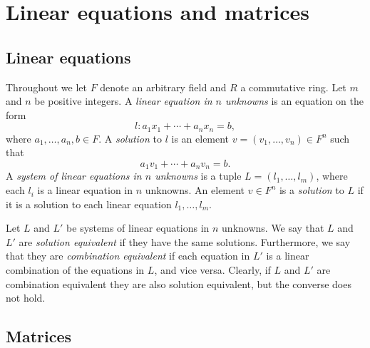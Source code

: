 \documentclass[article, a4paper, 11pt, oneside]{memoir}
\title{\doctitle}
\author{\docauthor}
\numberwithin{equation}{chapter}
\begin{document}
\maketitle

\chapter{Linear equations and matrices}

\section{Linear equations}

Throughout we let $F$ denote an arbitrary field and $R$ a commutative ring. Let $m$ and $n$ be positive integers. A \emph{linear equation in $n$ unknowns} is an equation on the form
%
\begin{equation*}
    l \colon a_1 x_1 + \cdots + a_n x_n = b,
\end{equation*}
%
where $a_1, \ldots, a_n, b \in F$. A \emph{solution} to $l$ is an element $v = (v_1, \ldots, v_n) \in F^n$ such that
%
\begin{equation*}
    a_1 v_1 + \cdots + a_n v_n = b.
\end{equation*}
%
A \emph{system of linear equations in $n$ unknowns} is a tuple $L = (l_1, \ldots, l_m)$, where each $l_i$ is a linear equation in $n$ unknowns. An element $v \in F^n$ is a \emph{solution} to $L$ if it is a solution to each linear equation $l_1, \ldots, l_m$.

Let $L$ and $L'$ be systems of linear equations in $n$ unknowns. We say that $L$ and $L'$ are \emph{solution equivalent} if they have the same solutions. Furthermore, we say that they are \emph{combination equivalent} if each equation in $L'$ is a linear combination of the equations in $L$, and vice versa. Clearly, if $L$ and $L'$ are combination equivalent they are also solution equivalent, but the converse does not hold.


\section{Matrices}
\end{document}

